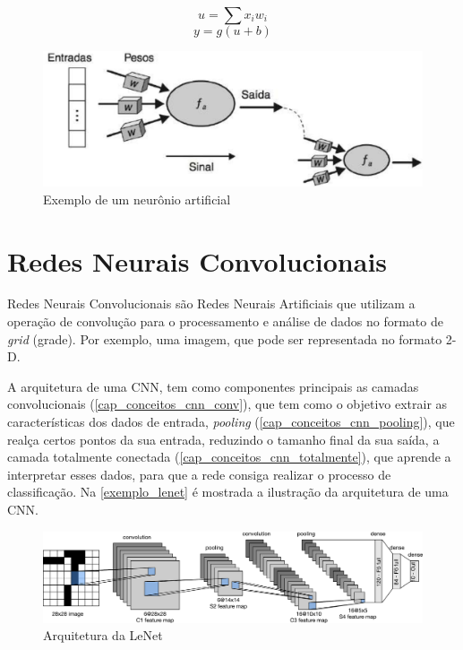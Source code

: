 \begin{equation}\label{eq_neuronio}
u = \sum x_i w_i
\end{equation}
\begin{equation}\label{eq_ativacao}
y = g(u + b)
\end{equation}

\begin{figure}[htb]
	\caption {\label{cap_conceitos_ex_neuronio} Exemplo de um neurônio artificial}
	\begin{center}
		\includegraphics[scale=0.3]{Imagens/exemplo_neuronio_artificial}
	\end{center}
\end{figure}

\section{Redes Neurais Convolucionais}\label{cap_conceitos_cnn}
Redes Neurais Convolucionais são Redes Neurais Artificiais que utilizam a operação de convolução para o processamento e
análise de dados no formato de \textit{grid} (grade).
Por exemplo, uma imagem, que pode ser representada no formato 2-D. \cite{Goodfellow-et-al-2016}

A arquitetura de uma CNN, tem como componentes principais as camadas convolucionais (\autoref{cap_conceitos_cnn_conv}),
que tem como o objetivo extrair as características dos dados de entrada,
\textit{pooling} (\autoref{cap_conceitos_cnn_pooling}), que realça certos pontos da sua entrada, reduzindo o tamanho
final da sua saída,
a camada totalmente conectada (\autoref{cap_conceitos_cnn_totalmente}), que aprende a interpretar esses dados,
para que a rede consiga realizar o processo de classificação.
Na \autoref{exemplo_lenet} é mostrada a ilustração da arquitetura de uma CNN.

\begin{figure}[htb]
	\caption {\label{exemplo_lenet} Arquitetura da LeNet}
	\begin{center}
		\includegraphics[scale=0.5]{Imagens/lenet}
	\end{center}
\end{figure}

